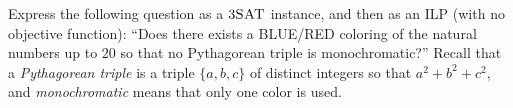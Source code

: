 \documentclass[12pt]{article}
\newenvironment{exercise}[2][Exercise]{\begin{trivlist}
		\item[\hskip \labelsep {\bfseries #1}\hskip \labelsep {\bfseries #2.}]}{\end{trivlist}}
\begin{document}
	\begin{exercise}{4} Express the following question as a $3\textsc{SAT}$ instance, and then as an ILP (with no objective function): ``Does there exists a BLUE/RED coloring of the natural numbers up to $20$ so that no Pythagorean triple is monochromatic?''  Recall that a {\em Pythagorean triple} is a triple $\{a,b,c\}$ of distinct integers so that $a^2+b^2+c^2$, and {\em monochromatic} means that only one color is used.  \\\\
		

\end{exercise}
\end{document}
